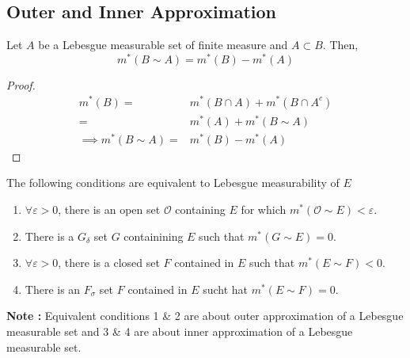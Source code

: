\subsection{Outer and Inner Approximation}
\begin{definition}
Let $A$ be a Lebesgue measurable set of finite measure and $A \subset B$.
	Then,
\begin{equation}
	m^\ast(B \sim A) = m^\ast(B) - m^\ast(A)
\end{equation}
\begin{proof}
\begin{align*}
	m^\ast(B) = & m^\ast(B \cap A) + m^\ast(B \cap A^c) \\
	= & m^\ast(A) + m^\ast(B \sim A) \\
	\implies m^\ast(B \sim A) = & m^\ast(B) - m^\ast(A)
\end{align*}
\end{proof}
\end{definition}

\begin{theorem}[approximation]
	The following conditions are equivalent to Lebesgue measurability of $E$
\begin{enumerate}
	\item $\forall \varepsilon > 0$, there is an open set $\mathcal{O}$ containing $E$ for which $m^\ast(\mathcal{O}\sim E) < \varepsilon$.
	\item There is a $G_\delta$ set $G$ containining $E$ such that $m^\ast(G \sim E) = 0$.
	\item $\forall \varepsilon > 0$, there is a closed set $F$ contained in $E$ such that $m^\ast(E\sim F) < 0$.
	\item There is an $F_\sigma$ set $F$ contained in $E$ sucht hat $m^\ast(E \sim F) = 0$.
\end{enumerate}
\end{theorem}

\textbf{Note :} Equivalent conditions 1 \& 2 are about outer approximation of a Lebesgue measurable set and 3 \& 4 are about inner approximation of a Lebesgue measurable set.\\

